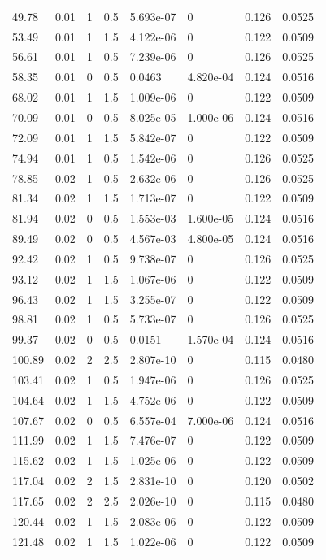 \documentclass[preview]{standalone}
\begin{document}
{{\begin{tabular}{L{1.2cm}C{1.2cm} C{0.3cm}C{0.5cm} C{1.4cm}C{1.4cm} C{1.4cm}C{1.4cm}}
  49.78  &  0.01  & 1     & 0.5 &  5.693e-07  & 0  & 0.126 &  0.0525   \\ 
  53.49  &  0.01  & 1     & 1.5 &  4.122e-06  & 0  & 0.122 &  0.0509   \\ 
  56.61  &  0.01  & 1     & 0.5 &  7.239e-06  & 0  & 0.126 &  0.0525   \\ 
  58.35  &  0.01  & 0     & 0.5 &  0.0463  & 4.820e-04  & 0.124 &  0.0516   \\ 
  68.02  &  0.01  & 1     & 1.5 &  1.009e-06  & 0  & 0.122 &  0.0509   \\ 
  70.09  &  0.01  & 0     & 0.5 &  8.025e-05  & 1.000e-06  & 0.124 &  0.0516   \\ 
  72.09  &  0.01  & 1     & 1.5 &  5.842e-07  & 0  & 0.122 &  0.0509   \\ 
  74.94  &  0.01  & 1     & 0.5 &  1.542e-06  & 0  & 0.126 &  0.0525   \\ 
  78.85  &  0.02  & 1     & 0.5 &  2.632e-06  & 0  & 0.126 &  0.0525   \\ 
  81.34  &  0.02  & 1     & 1.5 &  1.713e-07  & 0  & 0.122 &  0.0509   \\ 
  81.94  &  0.02  & 0     & 0.5 &  1.553e-03  & 1.600e-05  & 0.124 &  0.0516   \\ 
  89.49  &  0.02  & 0     & 0.5 &  4.567e-03  & 4.800e-05  & 0.124 &  0.0516   \\ 
  92.42  &  0.02  & 1     & 0.5 &  9.738e-07  & 0  & 0.126 &  0.0525   \\ 
  93.12  &  0.02  & 1     & 1.5 &  1.067e-06  & 0  & 0.122 &  0.0509   \\ 
  96.43  &  0.02  & 1     & 1.5 &  3.255e-07  & 0  & 0.122 &  0.0509   \\ 
  98.81  &  0.02  & 1     & 0.5 &  5.733e-07  & 0  & 0.126 &  0.0525   \\ 
  99.37  &  0.02  & 0     & 0.5 &  0.0151  & 1.570e-04  & 0.124 &  0.0516   \\ 
  100.89  &  0.02  & 2     & 2.5 &  2.807e-10  & 0  & 0.115 &  0.0480   \\ 
  103.41  &  0.02  & 1     & 0.5 &  1.947e-06  & 0  & 0.126 &  0.0525   \\ 
  104.64  &  0.02  & 1     & 1.5 &  4.752e-06  & 0  & 0.122 &  0.0509   \\ 
  107.67  &  0.02  & 0     & 0.5 &  6.557e-04  & 7.000e-06  & 0.124 &  0.0516   \\ 
  111.99  &  0.02  & 1     & 1.5 &  7.476e-07  & 0  & 0.122 &  0.0509   \\ 
  115.62  &  0.02  & 1     & 1.5 &  1.025e-06  & 0  & 0.122 &  0.0509   \\ 
  117.04  &  0.02  & 2     & 1.5 &  2.831e-10  & 0  & 0.120 &  0.0502   \\ 
  117.65  &  0.02  & 2     & 2.5 &  2.026e-10  & 0  & 0.115 &  0.0480   \\ 
  120.44  &  0.02  & 1     & 1.5 &  2.083e-06  & 0  & 0.122 &  0.0509   \\ 
  121.48  &  0.02  & 1     & 1.5 &  1.022e-06  & 0  & 0.122 &  0.0509   \\ 
\hline 
\end{tabular} 

}}
\end{document}
